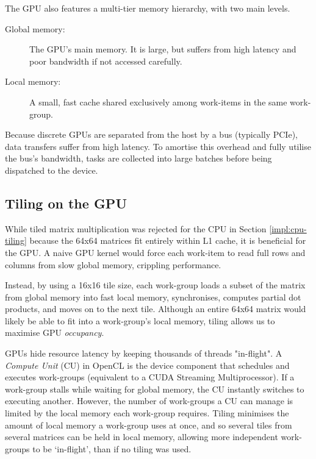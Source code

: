 The GPU also features a multi-tier memory hierarchy, with two main levels.
\begin{description}
  \item[Global memory:] The GPU's main memory. It is large, but suffers from high latency and poor bandwidth if not
    accessed carefully.
  \item[Local memory:] A small, fast cache shared exclusively among work-items in the same work-group.
\end{description}


Because discrete GPUs are separated from the host by a bus (typically PCIe), data transfers suffer from high latency.
To amortise this overhead and fully utilise the bus's bandwidth, tasks are collected into large batches before 
being dispatched to the device.

\subsection{Tiling on the GPU}

While tiled matrix multiplication was rejected for the CPU in Section \ref{impl:cpu-tiling}
because the 64x64 matrices fit entirely within L1 cache, it is beneficial for the GPU. A naive GPU kernel would force
each work-item to read full rows and columns from slow global memory, crippling performance.

Instead, by using a 16x16 tile size, each work-group loads a subset of the matrix from global memory 
into fast local memory, synchronises, computes partial dot products, and moves on to the next tile.
Although an entire 64x64 matrix would likely be able to fit into a work-group's local memory, tiling allows us to 
maximise GPU \textit{occupancy}.

GPUs hide resource latency by keeping thousands of threads "in-flight". A \textit{Compute Unit} (CU) in OpenCL is the device 
component that schedules and executes work-groups (equivalent to a CUDA Streaming Multiprocessor).
If a work-group stalls while waiting for global memory, the CU instantly switches to executing another.
However, the number of work-groups a CU can manage is limited by the local memory each work-group requires. 
Tiling minimises the amount of local memory a work-group uses at once, and so several tiles from several matrices 
can be held in local memory, allowing more independent work-groups to be `in-flight', than if no tiling was used.

